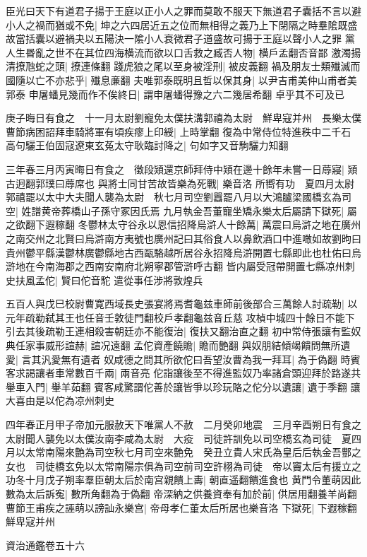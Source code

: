 臣光曰天下有道君子揚于王庭以正小人之罪而莫敢不服天下無道君子囊括不言以避小人之禍而猶或不免|{
	坤之六四居近五之位而無相得之義乃上下閉隔之時羣隂既盛故當括囊以避禍夬以五陽決一隂小人衰微君子道盛故可揚于王庭以聲小人之罪}
黨人生昬亂之世不在其位四海横流而欲以口舌救之臧否人物|{
	横戶孟翻否音鄙}
激濁揚清撩虺蛇之頭|{
	撩連條翻}
踐虎狼之尾以至身被淫刑|{
	被皮義翻}
禍及朋友士類殱滅而國隨以亡不亦悲乎|{
	殱息亷翻}
夫唯郭泰既明且哲以保其身|{
	以尹吉甫美仲山甫者美郭泰}
申屠蟠見幾而作不俟終日|{
	謂申屠蟠得豫之六二幾居希翻}
卓乎其不可及已

庚子晦日有食之　十一月太尉劉寵免太僕扶溝郭禧為太尉　鮮卑寇并州　長樂太僕曹節病困詔拜車騎將軍有頃疾瘳上印綬|{
	上時掌翻}
復為中常侍位特進秩中二千石　高句驪王伯固寇遼東玄菟太守耿臨討降之|{
	句如字又音駒驪力知翻}


三年春三月丙寅晦日有食之　徵段熲還京師拜侍中熲在邊十餘年未嘗一日蓐寢|{
	熲古迥翻郭璞曰蓐席也}
與將士同甘苦故皆樂為死戰|{
	樂音洛}
所嚮有功　夏四月太尉郭禧罷以太中大夫聞人襲為太尉　秋七月司空劉囂罷八月以大鴻臚梁國橋玄為司空|{
	姓譜黄帝葬橋山子孫守冢因氏焉}
九月執金吾董寵坐矯永樂太后屬請下獄死|{
	屬之欲翻下遐稼翻}
冬鬱林太守谷永以恩信招降烏滸人十餘萬|{
	萬震曰烏滸之地在廣州之南交州之北賢曰烏滸南方夷號也廣州記曰其俗食人以鼻飲酒口中進噉如故劉昫曰貴州鬱平縣漢鬱林廣鬱縣地古西甌駱越所居谷永招降烏滸開置七縣即此也杜佑曰烏滸地在今南海郡之西南安南府北朔寧郡管滸呼古翻}
皆内屬受冠帶開置七縣凉州刺史扶風孟佗|{
	賢曰佗音駝}
遣從事任涉將敦煌兵

五百人與戊巳校尉曹寛西域長史張宴將焉耆龜兹車師前後部合三萬餘人討疏勒|{
	以元年疏勒弑其王也任音壬敦徒門翻校戶孝翻龜兹音丘慈}
攻楨中城四十餘日不能下引去其後疏勒王連相殺害朝廷亦不能復治|{
	復扶又翻治直之翻}
初中常侍張讓有監奴典任家事威形諠赫|{
	諠况遠翻}
孟佗資產饒贍|{
	贍而艶翻}
與奴朋結傾竭饋問無所遺愛|{
	言其汎愛無有遺者}
奴咸德之問其所欲佗曰吾望汝曹為我一拜耳|{
	為于偽翻}
時賓客求謁讓者車常數百千兩|{
	兩音亮}
佗詣讓後至不得進監奴乃率諸倉頭迎拜於路遂共轝車入門|{
	轝羊茹翻}
賓客咸驚謂佗善於讓皆爭以珍玩賂之佗分以遺讓|{
	遺于季翻}
讓大喜由是以佗為凉州刺史

四年春正月甲子帝加元服赦天下唯黨人不赦　二月癸卯地震　三月辛酉朔日有食之　太尉聞人襲免以太僕汝南李咸為太尉　大疫　司徒許訓免以司空橋玄為司徒　夏四月以太常南陽來艶為司空秋七月司空來艶免　癸丑立貴人宋氏為皇后后執金吾酆之女也　司徒橋玄免以太常南陽宗俱為司空前司空許栩為司徒　帝以竇太后有援立之功冬十月戊子朔率羣臣朝太后於南宫親饋上夀|{
	朝直遥翻饋進食也}
黄門令董萌因此數為太后訴寃|{
	數所角翻為于偽翻}
帝深納之供養資奉有加於前|{
	供居用翻養羊尚翻}
曹節王甫疾之誣萌以謗訕永樂宫|{
	帝母孝仁董太后所居也樂音洛}
下獄死|{
	下遐稼翻}
鮮卑寇并州

資治通鑑卷五十六
